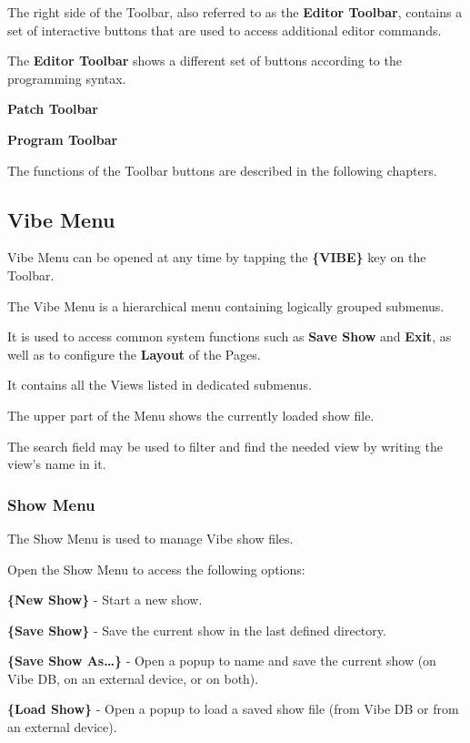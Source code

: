 \documentclass[
]{article}
\begin{document}
The right side of the Toolbar, also referred to as the \textbf{Editor Toolbar}, contains a set of interactive buttons that are used to access additional editor commands.

The \textbf{Editor Toolbar} shows a different set of buttons according to the programming syntax.

\textbf{Patch Toolbar}

\textbf{Program Toolbar}

The functions of the Toolbar buttons are described in the following chapters.

\hypertarget{Vibe-Menu-3.2}{%
\subsection{Vibe Menu}\label{Vibe-Menu-3.2}}

Vibe Menu can be opened at any time by tapping the \textbf{\{VIBE\}} key on the Toolbar.

The Vibe Menu is a hierarchical menu containing logically grouped submenus.

It is used to access common system functions such as \textbf{Save Show} and \textbf{Exit}, as well as to configure the \textbf{Layout} of the Pages.

It contains all the Views listed in dedicated submenus.

The upper part of the Menu shows the currently loaded show file.

The search field may be used to filter and find the needed view by writing the view's name in it.

\hypertarget{show-menu}{%
\subsubsection{Show Menu}\label{show-menu}}

The Show Menu is used to manage Vibe show files.

Open the Show Menu to access the following options:

\textbf{\{New Show\}} - Start a new show.

\textbf{\{Save Show\}} - Save the current show in the last defined directory.

\textbf{\{Save Show As\ldots\}} - Open a popup to name and save the current show (on Vibe DB, on an external device, or on both).

\textbf{\{Load Show\}} - Open a popup to load a saved show file (from Vibe DB or from an external device).
\end{document}
